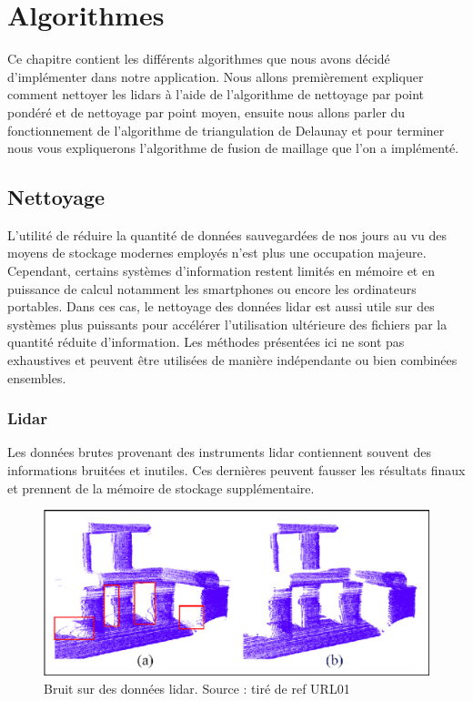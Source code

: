 \chapter{Algorithmes}

Ce chapitre contient les différents algorithmes que nous avons décidé d'implémenter dans notre application.
Nous allons premièrement expliquer comment nettoyer les lidars à l'aide de
l'algorithme de nettoyage par point pondéré et de nettoyage par point moyen,
ensuite nous allons parler du fonctionnement de l'algorithme de triangulation de 
Delaunay et pour terminer nous vous expliquerons l'algorithme de fusion de 
maillage que l'on a implémenté.

\section{Nettoyage}

L'utilité de réduire la quantité de données sauvegardées de nos jours au vu des 
moyens de stockage modernes employés n'est plus une occupation majeure.
Cependant, certains systèmes d'information restent limités en mémoire et en
puissance de calcul notamment les smartphones ou encore les ordinateurs portables.
Dans ces cas, 
le nettoyage des données \gls{lidar} est aussi utile sur des systèmes plus puissants
pour accélérer l'utilisation ultérieure des fichiers par la quantité réduite
d'information.
Les méthodes présentées ici ne sont pas exhaustives et peuvent être utilisées
de manière indépendante ou bien combinées ensembles.

\subsection{Lidar}

Les données brutes provenant des instruments \gls{lidar} contiennent souvent
des informations bruitées et inutiles.
Ces dernières peuvent fausser les résultats finaux et prennent de la mémoire
de stockage supplémentaire.

\begin{figure}[htbp!]
    \centering
    \includegraphics[width=0.8\linewidth]{figures/lidar noise.png}
    \caption{Bruit sur des données lidar. Source : tiré de ref URL01}
	\label{fig:lidar_noise}
\end{figure}

